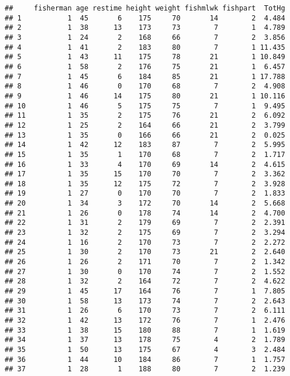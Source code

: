 \documentclass[12pt,]{article}
\begin{document}
\begin{verbatim}
##     fisherman age restime height weight fishmlwk fishpart  TotHg
## 1           1  45       6    175     70       14        2  4.484
## 2           1  38      13    173     73        7        1  4.789
## 3           1  24       2    168     66        7        2  3.856
## 4           1  41       2    183     80        7        1 11.435
## 5           1  43      11    175     78       21        1 10.849
## 6           1  58       2    176     75       21        1  6.457
## 7           1  45       6    184     85       21        1 17.788
## 8           1  46       0    170     68        7        2  4.908
## 9           1  46      14    175     80       21        1 10.116
## 10          1  46       5    175     75        7        1  9.495
## 11          1  35       2    175     76       21        2  6.092
## 12          1  25       2    164     66       21        2  3.799
## 13          1  35       0    166     66       21        2  0.025
## 14          1  42      12    183     87        7        2  5.995
## 15          1  35       1    170     68        7        2  1.717
## 16          1  33       4    170     69       14        2  4.615
## 17          1  35      15    170     70        7        2  3.362
## 18          1  35      12    175     72        7        2  3.928
## 19          1  27       0    170     70        7        2  1.833
## 20          1  34       3    172     70       14        2  5.668
## 21          1  26       0    178     74       14        2  4.700
## 22          1  31       2    179     69        7        2  2.391
## 23          1  32       2    175     69        7        2  3.294
## 24          1  16       2    170     73        7        2  2.272
## 25          1  30       2    170     73       21        2  2.640
## 26          1  26       2    171     70        7        2  1.342
## 27          1  30       0    170     74        7        2  1.552
## 28          1  32       2    164     72        7        2  4.622
## 29          1  45      17    164     76        7        1  7.805
## 30          1  58      13    173     74        7        2  2.643
## 31          1  26       6    170     73        7        2  6.111
## 32          1  42      13    172     76        7        1  2.476
## 33          1  38      15    180     88        7        1  1.619
## 34          1  37      13    178     75        4        2  1.789
## 35          1  50      13    175     67        4        3  2.484
## 36          1  44      10    184     86        7        1  1.757
## 37          1  28       1    188     80        7        2  1.239

\end{verbatim}
\end{document}
